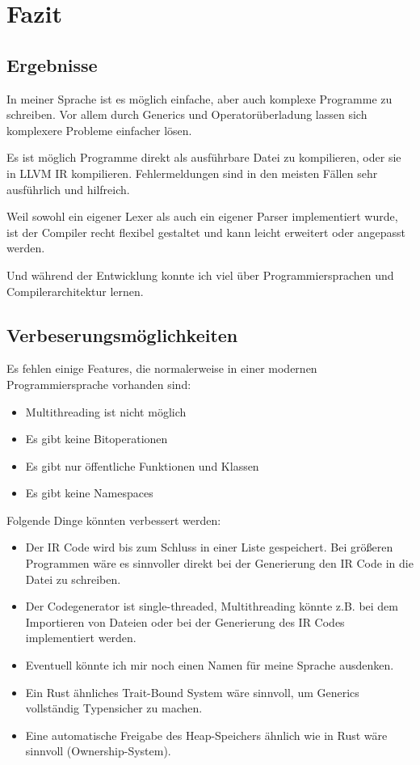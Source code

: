 \section{Fazit}
    \subsection{Ergebnisse}
        In meiner Sprache ist es möglich einfache, aber auch komplexe Programme zu schreiben.
        Vor allem durch Generics und Operatorüberladung lassen sich komplexere Probleme einfacher lösen.

        Es ist möglich Programme direkt als ausführbare Datei zu kompilieren, oder 
        sie in LLVM IR kompilieren. Fehlermeldungen sind in den meisten Fällen sehr ausführlich und hilfreich.

        Weil sowohl ein eigener Lexer als auch ein eigener Parser implementiert wurde,
        ist der Compiler recht flexibel gestaltet und kann leicht erweitert oder angepasst werden.

        Und während der Entwicklung konnte ich viel über Programmiersprachen und Compilerarchitektur lernen.

    \subsection{Verbeserungsmöglichkeiten}
        Es fehlen einige Features, die normalerweise in einer modernen Programmiersprache vorhanden sind:
        \begin{itemize}
            \item Multithreading ist nicht möglich
            \item Es gibt keine Bitoperationen
            \item Es gibt nur öffentliche Funktionen und Klassen
            \item Es gibt keine Namespaces
        \end{itemize}

        Folgende Dinge könnten verbessert werden:
        \begin{itemize}
            \item Der IR Code wird bis zum Schluss in einer Liste gespeichert. 
                Bei größeren Programmen wäre es sinnvoller direkt bei der Generierung den IR Code in die Datei zu schreiben. 
            \item Der Codegenerator ist single-threaded, 
                Multithreading könnte z.B. bei dem Importieren von Dateien oder bei der Generierung des IR Codes implementiert werden.
            \item Eventuell könnte ich mir noch einen Namen für meine Sprache ausdenken.
            \item Ein Rust ähnliches Trait-Bound System wäre sinnvoll, um Generics vollständig Typensicher zu machen.
            \item Eine automatische Freigabe des Heap-Speichers ähnlich wie in Rust wäre sinnvoll (Ownership-System).
        \end{itemize}